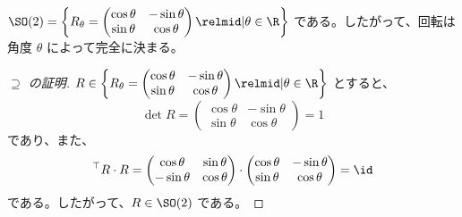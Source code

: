 \documentclass[article,paper=a4paper]{jlreq}
\begin{document}
\begin{prop}
    $\SO(2) = \left\{R_\theta = \begin{pmatrix}
        \cos\theta & -\sin\theta\\
        \sin\theta & \cos\theta
    \end{pmatrix} \relmid | \theta \in \R\right\}$ である。したがって、回転は角度 $\theta$ によって完全に決まる。
\end{prop}

\begin{proof}[$\supseteq $ の証明]
    $R \in \left\{R_\theta = \begin{pmatrix}
        \cos\theta & -\sin\theta\\
        \sin\theta & \cos\theta
    \end{pmatrix} \relmid | \theta \in \R\right\}$ とすると、
    \[\det R = \begin{pmatrix}
        \cos\theta & -\sin\theta\\
        \sin\theta & \cos\theta
    \end{pmatrix} = 1\] であり、また、
    \[{}^\top R \cdot R = \begin{pmatrix}
        \cos\theta & \sin\theta\\
        -\sin\theta & \cos\theta
    \end{pmatrix} \cdot \begin{pmatrix}
        \cos\theta & -\sin\theta\\
        \sin\theta & \cos\theta
    \end{pmatrix} = \id\] である。したがって、$R \in \SO(2)$ である。
\end{proof}
\end{document}
